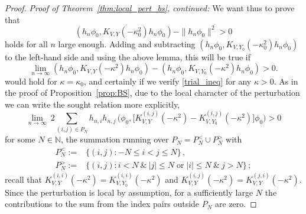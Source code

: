 \documentclass{article}
\numberwithin{equation}{section}
\theoremstyle{definition}
\newcommand{\N}{\mathbb{N}}
\begin{document}
\begin{proof}
\noindent \emph{Proof of Theorem~\ref{thm:local_pert_bs}, continued:} We want thus to prove that
\begin{equation*}
(h_n\phi_0, K_{V,Y}(-\kappa_0^2)h_n\phi_0) - \|h_n\phi_0\|^2 > 0
\end{equation*}
holds for all $n$ large enough. Adding and subtracting $(h_n\phi_0, K_{V,Y_0}(-\kappa_0^2)h_n\phi_0)$ to the left-hand side and using the above lemma, this will be true if
 \begin{equation} \label{trial_ineq}
\lim_{n\to\infty} (h_n\phi_0, K_{V,Y}(-\kappa^2)h_n\phi_0) - (h_n\phi_0, K_{V,Y_0}(-\kappa^2)h_n\phi_0) > 0.
\end{equation}
would hold for $\kappa=\kappa_0$, and certainly if we verify \eqref{trial_ineq} for any $\kappa>0$. As in the proof of Proposition~\ref{prop:BS}, due to the local character of the perturbation we can write the sought relation more explicitly,
\begin{equation*}
\lim_{n\to\infty} \:2\!\!\! \sum_{(i,j)\in P_N} h_{n,i}h_{n,j}\, \big(\phi_0, \big[K_{V,Y}^{(i,j)}(-\kappa^2) - K_{V,Y_0}^{(i,j)}(-\kappa^2)\big]\phi_0\big)>0
\end{equation*}
for some $N\in\N$, the summation running over $P_N=P_N^< \cup P_N^>$ with
\begin{align*}
P_N^<:= & \{(i,j): -N\le i<j\le N\}\,, \\[.2em]
P_N^>:= & \{(i,j): i<N\:\&\:|j|\le N \; \text{or}\; |i|\le N\:\&\:j>N\}\,;
\end{align*}
recall that $K_{V,Y}^{(i,i)}(-\kappa^2)= K_{V,Y_0}^{(i,i)}(-\kappa^2)$ and $K_{V,Y}^{(i,j)}(-\kappa^2)=K_{V,Y}^{(j,i)}(-\kappa^2)$. Since the perturbation is local by assumption, for a sufficiently large $N$ the contributions to the sum from the index pairs outside $P_N$ are zero.


\end{proof}
\end{document}
